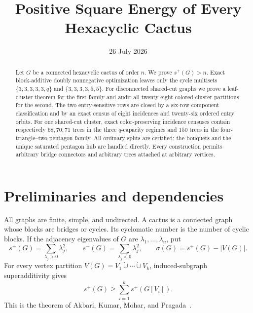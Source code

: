 \documentclass[11pt]{article}
\title{Positive Square Energy of Every Hexacyclic Cactus}
\author{}
\date{26 July 2026}
\newcommand{\spE}{s^+}
\newcommand{\smE}{s^-}
\newcommand{\sig}{\sigma}
\begin{document}
\maketitle

\begin{abstract}
Let $G$ be a connected hexacyclic cactus of order $n$.  We prove
$s^+(G)>n$.  Exact block-additive doubly nonnegative optimization leaves only
the cycle multisets $\{3,3,3,3,3,q\}$ and $\{3,3,3,3,5,5\}$.
For disconnected shared-cut graphs we prove a leaf-cluster theorem for the
first family and audit all twenty-eight colored cluster partitions for the
second.  The two entry-sensitive rows are closed by a six-row component
classification and by an exact census of eight incidences and twenty-six
ordered entry orbits.  For one shared-cut cluster, exact color-preserving
incidence censuses contain respectively $68,70,71$ trees in the three
$q$-capacity regimes and $150$ trees in the four-triangle--two-pentagon
family.  All ordinary splits are certified; the bouquets and the unique
saturated pentagon hub are handled directly.  Every construction permits
arbitrary bridge connectors and arbitrary trees attached at arbitrary
vertices.
\end{abstract}

\section{Preliminaries and dependencies}

All graphs are finite, simple, and undirected.  A cactus is a connected graph
whose blocks are bridges or cycles.  Its cyclomatic number is the number of
cyclic blocks.  If the adjacency eigenvalues of $G$ are
$\lambda_1,\ldots,\lambda_n$, put
\[
 \spE(G)=\sum_{\lambda_j>0}\lambda_j^2,
 \qquad \smE(G)=\sum_{\lambda_j<0}\lambda_j^2,
 \qquad \sig(G)=\spE(G)-|V(G)|.
\]
For every vertex partition $V(G)=V_1\mathbin{\dot\cup}\cdots
\mathbin{\dot\cup}V_k$, induced-subgraph superadditivity gives
\begin{equation}\label{eq:super}
 \spE(G)\geq\sum_{i=1}^k\spE(G[V_i]).
\end{equation}
This is the theorem of Akbari, Kumar, Mohar, and Pragada~\cite{AKMP}.
\end{document}
